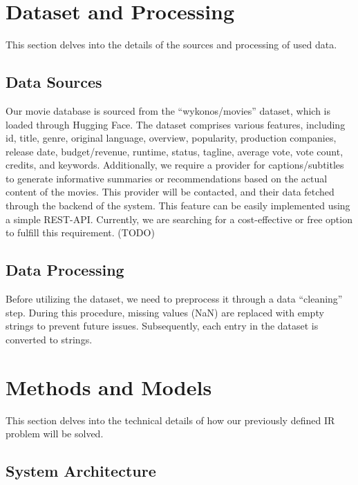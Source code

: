 \documentclass[11pt,a4paper]{article}
\begin{document}
  \section{Dataset and Processing}

  This section delves into the details of the sources and processing of used data.

  \subsection{Data Sources}

  Our movie database is sourced from the ``wykonos/movies'' dataset, which is loaded through Hugging Face.
  The dataset comprises various features, including id, title, genre, original language, overview, popularity, production companies, release date, budget/revenue, runtime, status, tagline, average vote, vote count, credits, and keywords.\newline\newline
  \noindent Additionally, we require a provider for captions/subtitles to generate informative summaries or recommendations based on the actual content of the movies.
  This provider will be contacted, and their data fetched through the backend of the system.
  This feature can be easily implemented using a simple REST-API. Currently, we are searching for a cost-effective or free option to fulfill this requirement. (TODO)

  \subsection{Data Processing}

  Before utilizing the dataset, we need to preprocess it through a data ``cleaning'' step.
  During this procedure, missing values (NaN) are replaced with empty strings to prevent future issues.
  Subsequently, each entry in the dataset is converted to strings.

  \section{Methods and Models}

  This section delves into the technical details of how our previously defined IR problem will be solved.

  \subsection{System Architecture}
\end{document}

